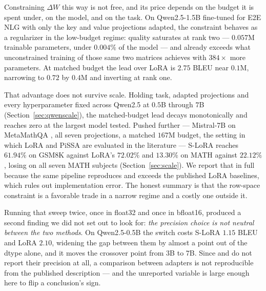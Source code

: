 \documentclass{article}
\theoremstyle{remark}
\begin{document}
Constraining $\Delta W$ this way is not free, and its price depends on the
budget it is spent under, on the model, and on the task. On Qwen2.5-1.5B
fine-tuned for E2E NLG \citep{novikova2017e2e} with only the key and value
projections adapted, the constraint behaves as a regularizer in the low-budget
regime: quality saturates at rank two --- $0.057$M trainable parameters, under
$0.004\%$ of the model --- and already exceeds what unconstrained training of
those same two matrices achieves with $384\times$ more parameters. At matched
budget the lead over LoRA is $2.75$ BLEU near $0.1$M, narrowing to $0.72$ by
$0.4$M and inverting at rank one.

That advantage does not survive scale. Holding task, adapted projections and
every hyperparameter fixed across Qwen2.5 at $0.5$B through $7$B
(Section~\ref{sec:qwenscale}), the matched-budget lead decays monotonically and
reaches zero at the largest model tested. Pushed further --- Mistral-7B
\citep{jiang2023mistral} on MetaMathQA \citep{yu2024metamath}, all seven
projections, a matched $167$M budget, the setting in which LoRA and PiSSA are
evaluated in the literature --- S-LoRA reaches $61.94\%$ on GSM8K against LoRA's
$72.02\%$ and $13.30\%$ on MATH against $22.12\%$, losing on all seven MATH
subjects (Section~\ref{sec:scale}). We report that in full because the same
pipeline reproduces and exceeds the published LoRA baselines, which rules out
implementation error. The honest summary is that the row-space constraint is a
favorable trade in a narrow regime and a costly one outside it.

Running that sweep twice, once in float32 and once in bfloat16, produced a
second finding we did not set out to look for: \emph{the precision choice is not
neutral between the two methods}. On Qwen2.5-0.5B the switch costs S-LoRA $1.15$
BLEU and LoRA $2.10$, widening the gap between them by almost a point out of the
dtype alone, and it moves the crossover point from $3$B to $7$B. Since
\citet{hu2022lora} and \citet{kopiczko2024vera} do not report their precision at
all, a comparison between adapters is not reproducible from the published
description --- and the unreported variable is large enough here to flip a
conclusion's sign.
\end{document}
